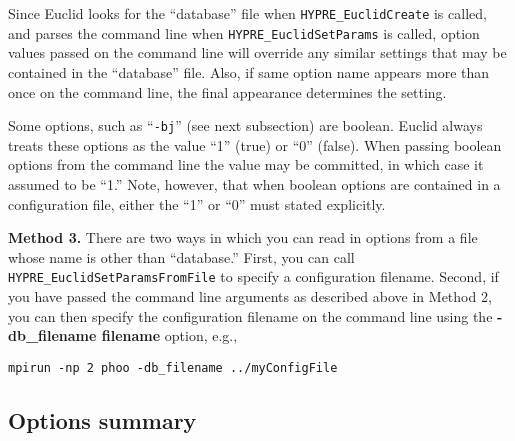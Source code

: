 Since Euclid looks for the ``database'' file when 
{\tt HYPRE\_EuclidCreate} is called, and parses the command line 
when {\tt HYPRE\_EuclidSetParams} is called,
option values passed on the command line will override 
any similar settings that may be contained in the ``database'' file.
Also, if same option name appears more than once on the command 
line, the final appearance determines the setting.

Some options, such as ``{\tt -bj}'' (see next subsection) are boolean.
Euclid always treats these options as the value ``1'' (true)
or ``0'' (false).  
When passing boolean options from the command line
the value may be committed, in which case it assumed to be ``1.''
Note, however, that when boolean options are contained in a
configuration file, either the ``1'' or ``0'' must
stated explicitly.

{\bf Method 3.}
There are two ways in which you can read in options from a file
whose name is other than ``database.''
First, you can call {\tt HYPRE\_EuclidSetParamsFromFile}
to specify a configuration filename.
Second, if you have passed the command line arguments as 
described above in Method 2, 
you can then specify the configuration filename on the command
line using the {\bf -db\_filename filename} option, e.g.,

\begin{display}
\begin{verbatim}
mpirun -np 2 phoo -db_filename ../myConfigFile
\end{verbatim}
\end{display}


\subsection{Options summary}

